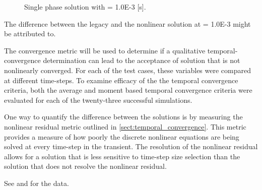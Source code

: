\begin{figure}[h!t]
\centering
{}
\caption[Single phase solution at \dtmax{} = 1.0E-3 {[s]}]{Single phase solution with \dtmax{} = 1.0E-3 {[s]}.}
\label{fig:single_compare_2}
\end{figure}

The difference between the legacy and the nonlinear solution at \dtmax{} = 1.0E-3 might be attributed to.

The convergence metric will be used to determine if a qualitative temporal-convergence determination can lead to the acceptance of solution that is not nonlinearly converged.
For each of the test cases, these variables were compared at different time-steps.
To examine efficacy of the the temporal convergence criteria, both the average and moment based temporal convergence criteria were evaluated for each of the twenty-three successful simulations.

One way to quantify the difference between the solutions is by measuring the nonlinear residual metric outlined in \ref{sect:temporal_convergence}.
This metric provides a measure of how poorly the discrete nonlinear equations are being solved at every time-step in the transient.
The resolution of the nonlinear residual allows for a solution that is less sensitive to time-step size selection than the solution that does not resolve the nonlinear residual.

See  and  for the data.

